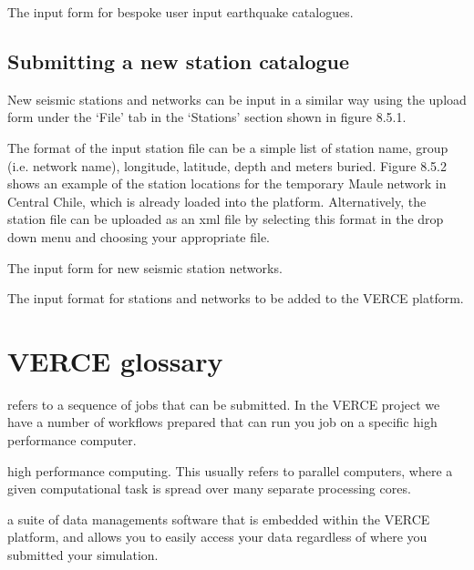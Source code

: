 \documentclass[english]{book}
\begin{document}

 The input form for bespoke user input earthquake
catalogues.


\section{Submitting a new station catalogue}
\label{\detokenize{Section8:submitting-a-new-station-catalogue}}
New seismic stations and networks can be input in a similar way using
the upload form under the ‘File’ tab in the ‘Stations’ section shown in
figure 8.5.1.

The format of the input station file can be a simple list of station
name, group (i.e. network name), longitude, latitude, depth and meters
buried. Figure 8.5.2 shows an example of the station locations for the
temporary Maule network in Central Chile, which is already loaded into
the platform. Alternatively, the station file can be uploaded as an xml
file by selecting this format in the drop down menu and choosing your
appropriate file.


 The input form for new seismic station networks.


 The input format for stations and networks to be added
to the VERCE platform.


\chapter{VERCE glossary}
\label{\detokenize{Glossary::doc}}\label{\detokenize{Glossary:verce-glossary}}

 \textendash{} refers to a sequence of jobs that can be submitted. In
the VERCE project we have a number of workflows prepared that can run
you job on a specific high performance computer.

 \textendash{} high performance computing. This usually refers to parallel
computers, where a given computational task is spread over many separate
processing cores.

 \textendash{} a suite of data managements software that is embedded within
the VERCE platform, and allows you to easily access your data regardless
of where you submitted your simulation.
\end{document}
